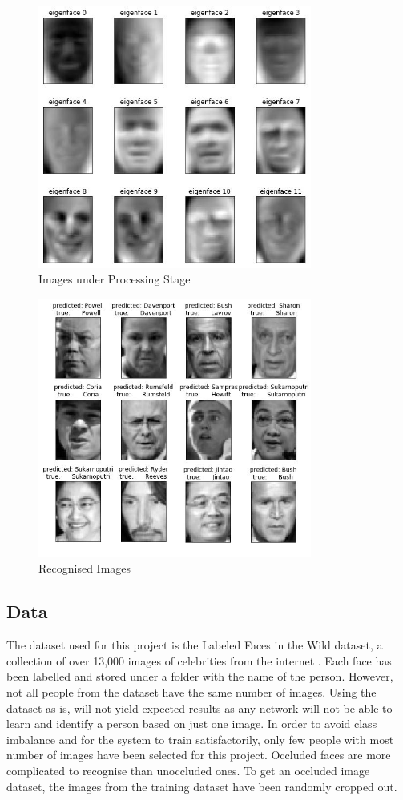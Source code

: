 \documentclass[conference]{IEEEtran}
\begin{document}
\begin{figure}[h!]
 \centering
 \includegraphics[width = 9cm]{eigenface.JPG}
 \caption{ Images under Processing Stage}
 \label{fig 3:Processing Stage}
\end{figure}

\begin{figure}[h!]
 \centering
 \includegraphics[width = 9cm]{PCA_pred.JPG}
 \caption{Recognised Images}
 \label{fig 4: Ouput}
\end{figure}


\subsection{Data} 
\label{subsec: 4a. Data}
The dataset used for this project is the Labeled Faces in the Wild dataset, a collection of over 13,000 images of celebrities from the internet \cite{LFWTech}. Each face has been labelled and stored under a folder with the name of the person. However, not all people from the dataset have the same number of images. Using the dataset as is, will not yield expected results as any network will not be able to learn and identify a person based on just one image. In order to avoid class imbalance and for the system to train satisfactorily, only few people with most number of images have been selected for this project. Occluded faces are more complicated to recognise than unoccluded ones. To get an occluded image dataset, the images from the training dataset have been randomly cropped out. 
\end{document}
